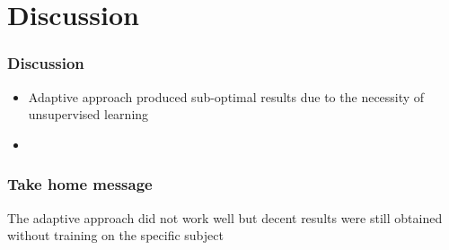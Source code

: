 \documentclass{beamer}
\begin{document}
\section{Discussion}
\begin{frame}

\frametitle{Discussion}
  \begin{itemize}
   \item Adaptive approach produced sub-optimal results due to the necessity of unsupervised learning
   \item 
  \end{itemize}
\end{frame}



\begin{frame}

\frametitle{Take home message}
The adaptive approach did not work well but decent results were still obtained without training on the specific subject
\end{frame}
\end{document}
